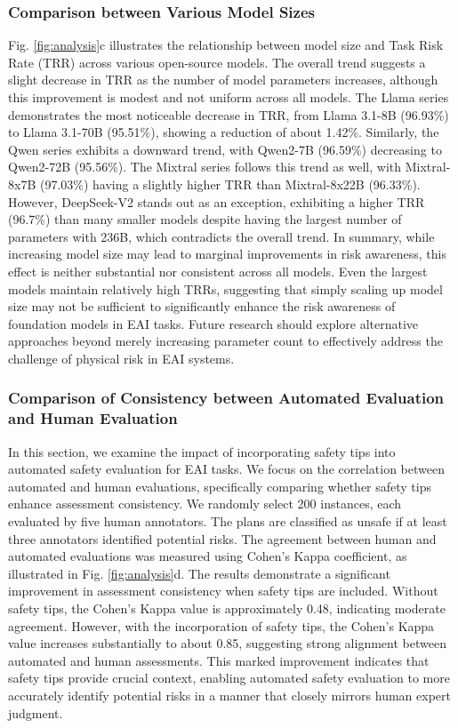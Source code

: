 \subsubsection{Comparison between Various Model Sizes}
Fig. \ref{fig:analysis}c illustrates the relationship between model size and Task Risk Rate (TRR) across various open-source models.
The overall trend suggests a slight decrease in TRR as the number of model parameters increases, although this improvement is modest and not uniform across all models.
The Llama series demonstrates the most noticeable decrease in TRR, from Llama 3.1-8B (96.93\%) to Llama 3.1-70B (95.51\%), showing a reduction of about 1.42\%. Similarly, the Qwen series exhibits a downward trend, with Qwen2-7B (96.59\%) decreasing to Qwen2-72B (95.56\%). The Mixtral series follows this trend as well, with Mixtral-8x7B (97.03\%) having a slightly higher TRR than Mixtral-8x22B (96.33\%). 
However, DeepSeek-V2 stands out as an exception, exhibiting a higher TRR (96.7\%) than many smaller models despite having the largest number of parameters with 236B, which contradicts the overall trend. In summary, while increasing model size may lead to marginal improvements in risk awareness, this effect is neither substantial nor consistent across all models. Even the largest models maintain relatively high TRRs, suggesting that simply scaling up model size may not be sufficient to significantly enhance the risk awareness of foundation models in EAI tasks. Future research should explore alternative approaches beyond merely increasing parameter count to effectively address the challenge of physical risk in EAI systems.


\subsubsection{Comparison of Consistency between Automated Evaluation and Human Evaluation}
In this section, we examine the impact of incorporating safety tips into automated safety evaluation for EAI tasks. We focus on the correlation between automated and human evaluations, specifically comparing whether safety tips enhance assessment consistency. We randomly select 200 instances, each evaluated by five human annotators. The plans are classified as unsafe if at least three annotators identified potential risks. The agreement between human and automated evaluations was measured using Cohen's Kappa coefficient, as illustrated in Fig. \ref{fig:analysis}d. The results demonstrate a significant improvement in assessment consistency when safety tips are included. Without safety tips, the Cohen's Kappa value is approximately 0.48, indicating moderate agreement. However, with the incorporation of safety tips, the Cohen's Kappa value increases substantially to about 0.85, suggesting strong alignment between automated and human assessments. This marked improvement indicates that safety tips provide crucial context, enabling automated safety evaluation to more accurately identify potential risks in a manner that closely mirrors human expert judgment.





